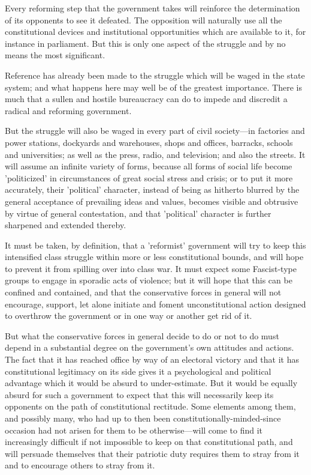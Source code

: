 Every reforming step that the government takes will reinforce the determination of its opponents to see it defeated. The opposition will naturally use all the constitutional devices and institutional opportunities which are available to it, for instance in parliament. But this is only one aspect of the struggle and by no means the most significant.

Reference has already been made to the struggle which will be waged in the state system; and what happens here may well be of the greatest importance. There is much that a sullen and hostile bureaucracy can do to impede and discredit a radical and reforming government.

But the struggle will also be waged in every part of civil society—in factories and power stations, dockyards and warehouses, shops and offices, barracks, schools and universities; as well as the press, radio, and television; and also the streets. It will assume an infinite variety of forms, because all forms of social life become 'politicized' in circumstances of great social stress and crisis; or to put it more accurately, their 'political' character, instead of being as hitherto blurred by the general acceptance of prevailing ideas and values, becomes visible and obtrusive by virtue of general contestation, and that 'political' character is further sharpened and extended thereby.

It must be taken, by definition, that a 'reformist' government will try to keep this intensified class struggle within more or less constitutional bounds, and will hope to prevent it from spilling over into class war. It must expect some Fascist-type groups to engage in sporadic acts of violence; but it will hope that this can be confined and contained, and that the conservative forces in general will not encourage, support, let alone initiate and  foment unconstitutional action designed to overthrow the government or in one way or another get rid of it.

But what the conservative forces in general decide to do or not to do must depend in a substantial degree on the government's own attitudes and actions. The fact that it has reached office by way of an electoral victory and that it has constitutional legitimacy on its side gives it a psychological and political advantage which it would be absurd to under-estimate. But it would be equally absurd for such a government to expect that this will necessarily keep its opponents on the path of constitutional rectitude. Some elements among them, and possibly many, who had up to then been constitutionally-minded-since occasion had not arisen for them to be otherwise—will come to find it increasingly difficult if not impossible to keep on that constitutional path, and will persuade themselves that their patriotic duty requires them to stray from it and to encourage others to stray from it.

